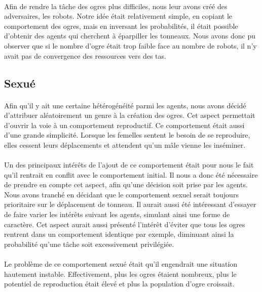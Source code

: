 \paragraph{}
Afin de rendre la tâche des ogres plus difficiles, nous leur avons créé des
adversaires, les robots. Notre idée était relativement simple, en copiant le
comportement des ogres, mais en inversant les probabilités, il était possible
d'obtenir des agents qui cherchent à éparpiller les tonneaux. Nous avons donc
pu observer que si le nombre d'ogre était trop faible face au nombre de robots,
il n'y avait pas de convergence des ressources vers des tas.


\subsection{Sexué}
\paragraph{}
Afin qu'il y ait une certaine hétérogénéité parmi les agents, nous avons décidé
d'attribuer aléatoirement un genre à la création des ogres. Cet aspect
permettait d'ouvrir la voie à un comportement reproductif. Ce comportement était
aussi d'une grande simplicité. Lorsque les femelles sentent le besoin de se
reproduire, elles cessent leurs déplacements et attendent qu'un mâle vienne les
inséminer.

\paragraph{}
Un des principaux intérêts de l'ajout de ce comportement était pour nous le fait
qu'il rentrait en conflit avec le comportement initial. Il nous a donc été
nécessaire de prendre en compte cet aspect, afin qu'une décision soit prise par
les agents. Nous avons tranché en décidant que le comportement sexuel serait
toujours prioritaire sur le déplacement de tonneau. Il aurait aussi été
intéressant d'essayer de faire varier les intérêts suivant les agents, simulant
ainsi une forme de caractère. Cet aspect aurait aussi présenté l'intérêt
d'éviter que tous les ogres rentrent dans un comportement identique par exemple,
diminuant ainsi la probabilité qu'une tâche soit excessivement privilégiée.

\paragraph{}
Le problème de ce comportement sexué était qu'il engendrait une situation
hautement instable. Effectivement, plus les ogres étaient nombreux, plus le
potentiel de reproduction était élevé et plus la population d'ogre croissait.

